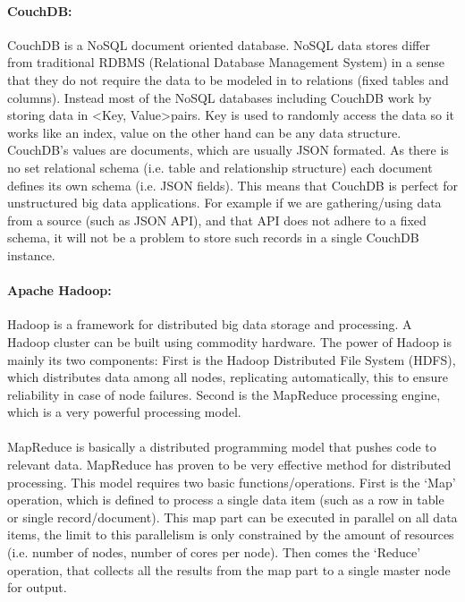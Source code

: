 \documentclass[12pt]{report}
\theoremstyle{named}
\begin{document}
\paragraph{CouchDB:\\}
CouchDB is a NoSQL document oriented database. NoSQL data stores differ from traditional RDBMS (Relational Database Management System) in a sense that they do not require the data to be modeled in to relations (fixed tables and columns). Instead most of the NoSQL databases including CouchDB work by storing data in \textless Key, Value\textgreater pairs. Key is used to randomly access the data so it works like an index, value on the other hand can be any data structure. CouchDB's values are documents, which are usually JSON formated. As there is no set relational schema (i.e. table and relationship structure) each document defines its own schema (i.e. JSON fields). This means that CouchDB is perfect for unstructured big data applications. For example if we are gathering/using data from a source (such as JSON API), and that API does not adhere to a fixed schema, it will not be a problem to store such records in a single CouchDB instance.

\paragraph{Apache Hadoop:\\}
Hadoop is a framework for distributed big data storage and processing. A Hadoop cluster can be built using commodity hardware. The power of Hadoop is mainly its two components: First is the Hadoop Distributed File System (HDFS), which distributes data among all nodes, replicating automatically, this to ensure reliability in case of node failures. Second is the MapReduce processing engine, which is a very powerful processing model.
\paragraph{}
MapReduce is basically a distributed programming model that pushes code to relevant data. MapReduce has proven to be very effective method for distributed processing. This model requires two basic functions/operations. First is the `Map' operation, which is defined to process a single data item (such as a row in table or single record/document). This map part can be executed in parallel on all data items, the limit to this parallelism is only constrained by the amount of resources (i.e. number of nodes, number of cores per node). Then comes the `Reduce' operation, that collects all the results from the map part to a single master node for output. 
\end{document}
